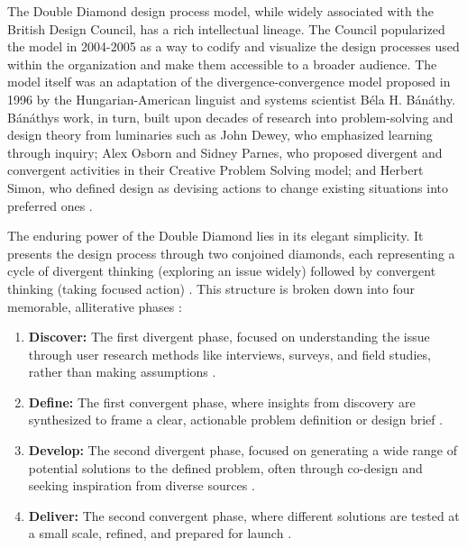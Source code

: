 \documentclass[
  12pt,
  a4paper,
  bibliography=totoc,
  numbers=noenddot
]{scrartcl}
\begin{document}
The Double Diamond design process model, while widely associated with
the British Design Council, has a rich intellectual lineage. The Council
popularized the model in 2004-2005 as a way to codify and visualize the
design processes used within the organization and make them accessible
to a broader audience.\cite{wikipedia2025double1} The model itself was an
adaptation of the divergence-convergence model proposed in 1996 by the
Hungarian-American linguist and systems scientist Béla H.
Bánáthy.\cite{wikipedia2025double1} Bánáthy\textquotesingle s work, in turn,
built upon decades of research into problem-solving and design theory
from luminaries such as John Dewey, who emphasized learning through
inquiry; Alex Osborn and Sidney Parnes, who proposed divergent and
convergent activities in their Creative Problem Solving model; and
Herbert Simon, who defined design as devising actions to change existing
situations into preferred ones \cite{medium2025double}.

The enduring power of the Double Diamond lies in its elegant simplicity.
It presents the design process through two conjoined diamonds, each
representing a cycle of divergent thinking (exploring an issue widely)
followed by convergent thinking (taking focused
action) \cite{wikipedia2025double2}. This structure is broken down into four
memorable, alliterative phases \cite{designcouncil2025history}:

\begin{enumerate}
\def\labelenumi{\arabic{enumi}.}
\item
  \textbf{Discover:} The first divergent phase, focused on understanding
  the issue through user research methods like interviews, surveys, and
  field studies, rather than making assumptions \cite{wikipedia2025double2}.
\item
  \textbf{Define:} The first convergent phase, where insights from
  discovery are synthesized to frame a clear, actionable problem
  definition or design brief \cite{wikipedia2025double2}.
\item
  \textbf{Develop:} The second divergent phase, focused on generating a
  wide range of potential solutions to the defined problem, often
  through co-design and seeking inspiration from diverse
  sources \cite{wikipedia2025double2}.
\item
  \textbf{Deliver:} The second convergent phase, where different
  solutions are tested at a small scale, refined, and prepared for
  launch \cite{wikipedia2025double2}.
\end{enumerate}
\end{document}
